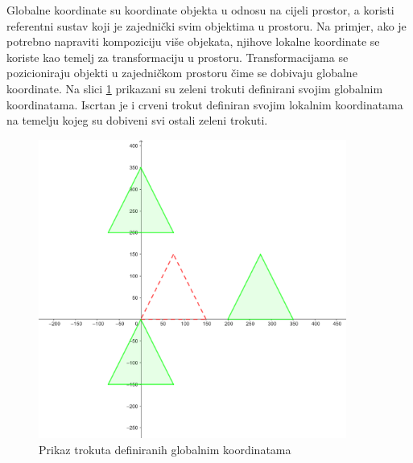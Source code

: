 \documentclass{foi}
\begin{document}
Globalne koordinate su koordinate objekta u odnosu na cijeli prostor, a koristi referentni sustav koji je zajednički svim objektima u prostoru. Na primjer, ako je potrebno napraviti kompoziciju više objekata, njihove lokalne koordinate se koriste kao temelj za transformaciju u prostoru. Transformacijama se pozicioniraju objekti u zajedničkom prostoru čime se dobivaju globalne koordinate. Na slici \ref{fig:GlobalneKoordinateTrokuti} prikazani su zeleni trokuti definirani svojim globalnim koordinatama. Iscrtan je i crveni trokut definiran svojim lokalnim koordinatama na temelju kojeg su dobiveni svi ostali zeleni trokuti.
\\
\begin{figure}[H]
    \centering
    \includegraphics[width=0.9\textwidth]{slike/3_GlobalneKoordinateTrokuti.png}
    \captionsetup{justification=centering}
    \caption{Prikaz trokuta definiranih globalnim koordinatama}
\label{fig:GlobalneKoordinateTrokuti}
\end{figure}
\end{document}
